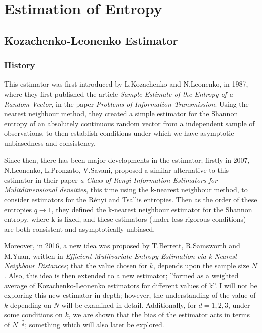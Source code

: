 \documentclass{report}
\begin{document}
\chapter{Estimation of Entropy}


\section{Kozachenko-Leonenko Estimator}

\subsection{History}

This estimator was first introduced by L.Kozachenko and N.Leonenko, in 1987, where they first published the article \textit{Sample Estimate of the Entropy of a Random Vector}, in the paper \textit{Problems of Information Transmission}. Using the nearest neighbour method, they created a simple estimator for the Shannon entropy of an absolutely continuous random vector from a independent sample of observations, to then establish conditions under which we have asymptotic unbiasedness and consistency.

Since then, there has been major developments in the estimator; firstly in 2007, N.Leonenko, L.Pronzato, V.Savani, proposed a similar alternative to this estimator in their paper \textit{a Class of Renyi Information Estimators for Mulitdimensional densities}, this time using the k-nearest neighbour method, to consider estimators for the R\'enyi and Tsallis entropies. Then as the order of these entropies $q \to 1$, they defined the k-nearest neighbour estimator for the Shannon entropy, where k is fixed, and these estimators (under less rigorous conditions) are both consistent and asymptotically unbiased.

Moreover, in 2016, a new idea was proposed by T.Berrett, R.Samsworth and M.Yuan, written in \textit{Efficient Mulitvariate Entropy Estimation via k-Nearest Neighbour Distances}; that the value chosen for $k$, depends upon the sample size $N$. Also, this idea is then extended to a new estimator; ''formed as a weighted average of Kozachenko-Leonenko estimators for different values of k''. I will not be exploring this new estimator in depth; however, the understanding of the value of $k$ depending on $N$ will be examined in detail. Additionally, for $d=1, 2,3$, under some conditions on $k$, we are shown that the bias of the estimator acts in terms of $N^{-\frac{2}{d}}$; something which will also later be explored.
\end{document}
